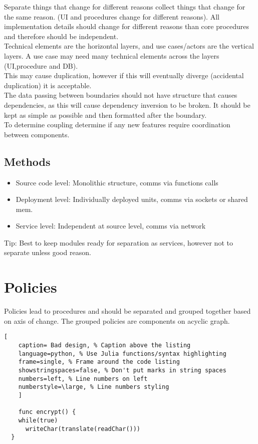 \documentclass[11pt]{scrartcl} %
\begin{document}
Separate things that change for different reasons collect things that change for the same reason.
(UI and procedures change for different reasons). All implementation details should change for 
different reasons than core procedures and therefore should be independent.\\

Technical elements are the horizontal layers, and use cases/actors are the vertical layers. A use 
case may need many technical elements across the layers (UI,procedure and DB).\\

This may cause duplication, however if this will eventually diverge (accidental duplication) it is 
acceptable.\\

The data passing between boundaries should not have structure that causes dependencies, as this will
cause dependency inversion to be broken. It should be kept as simple as possible and then formatted
after the boundary.\\

To determine coupling determine if any new features require coordination between components.

\subsection{Methods}

\begin{itemize}
  \item Source code level: Monolithic structure, comms via functions calls
  \item Deployment level: Individually deployed units, comms via sockets or shared mem.
  \item Service level: Independent at source level, comms via network
\end{itemize}

Tip: Best to keep modules ready for separation as services, however not to separate unless good reason.

\section{Policies}

Policies lead to procedures and should be separated and grouped together based on axis of change.
The grouped policies are components on acyclic graph.

\begin{lstlisting}[
	caption= Bad design, % Caption above the listing
	language=python, % Use Julia functions/syntax highlighting
	frame=single, % Frame around the code listing
	showstringspaces=false, % Don't put marks in string spaces
	numbers=left, % Line numbers on left
	numberstyle=\large, % Line numbers styling
	]

	func encrypt() {
    while(true)
      writeChar(translate(readChar()))
  }

\end{lstlisting}
\end{document}
